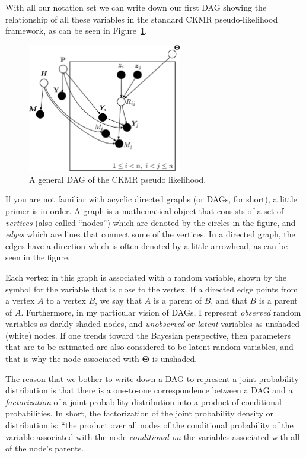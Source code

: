 \documentclass[11pt, oneside]{article}   	%
\newcommand{\bT}{\mathbf{\Theta}}
\begin{document}
With all our notation set we can write down our first DAG showing the relationship of all these variables in the
standard CKMR pseudo-likelihood framework, as can
be seen in Figure~\ref{fig:general_dag_1}.
\begin{figure}
\begin{center}
\includegraphics[width=0.6\textwidth]{images/general-dag-1.pdf}
\end{center}
\caption{A general DAG of the CKMR pseudo likelihood.}
\label{fig:general_dag_1}
\end{figure}
If you are not familiar with acyclic directed graphs (or DAGs, for short), a little primer is in order.
A graph is a mathematical object that consists of a set of {\em vertices} (also called ``nodes'') which are denoted by the circles
in the figure, and {\em edges} which are lines that connect some of the vertices.  In a directed graph, the edges
have a direction which is often denoted by a little arrowhead, as can be seen in the figure.

Each vertex in this graph is associated with a random variable, shown by the symbol for the variable that is close
to the vertex.  If a directed edge points from a vertex $A$ to a vertex $B$, we say that $A$ is a parent of $B$, and that
$B$ is a parent of $A$.  Furthermore, in my particular vision of DAGs, I represent {\em observed} random variables
as darkly shaded nodes, and {\em unobserved} or {\em latent} variables as unshaded (white) nodes.  If one trends toward
the Bayesian perspective, then parameters that are to be estimated are also considered to be latent random variables,
and that is why the node associated with $\bT$ is unshaded.

The reason that we bother to write down a DAG to represent a joint probability distribution is that there is a one-to-one
correspondence between a DAG and a {\em factorization} of a joint probability distribution into a product of conditional
probabilities.  In short, the factorization of the joint probability density or distribution is: ``the product over all nodes of
the conditional probability of the variable associated with the node {\em conditional on} the variables associated with
all of the node's parents.
\end{document}
